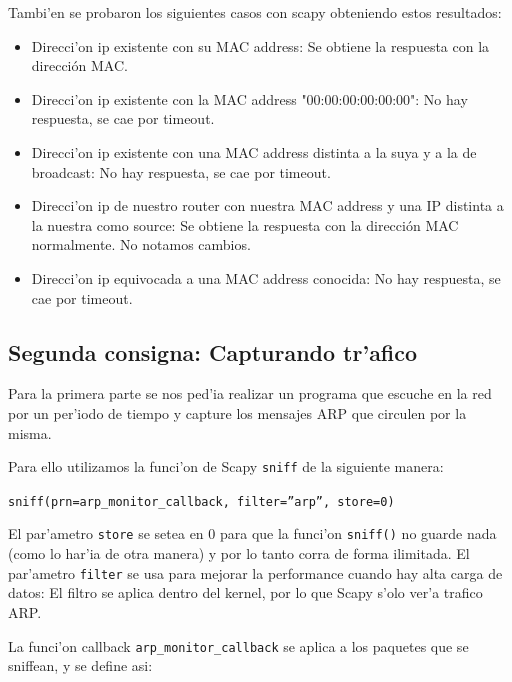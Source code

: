 \documentclass[a4paper,10pt]{article}
\begin{document}
Tambi'en se probaron los siguientes casos con scapy obteniendo estos resultados:

\begin{itemize}
	\item Direcci'on ip existente con su MAC address: Se obtiene la respuesta con la dirección MAC.
	\item Direcci'on ip existente con la MAC address "00:00:00:00:00:00": No hay respuesta, se cae por timeout.
	\item Direcci'on ip existente con una MAC address distinta a la suya y a la de broadcast: No hay respuesta, se cae por timeout.
	\item Direcci'on ip de nuestro router con nuestra MAC address y una IP distinta a la nuestra como source: Se obtiene la respuesta con la dirección MAC normalmente. No notamos cambios.
	\item Direcci'on ip equivocada a una MAC address conocida: No hay respuesta, se cae por timeout.
\end{itemize}

\subsection{Segunda consigna: Capturando tr'afico}
\label{expli1:}

Para la primera parte se nos ped'ia realizar un programa que escuche en la red por un per'iodo de tiempo y capture los mensajes ARP que circulen por la misma.

\vspace*{5 mm}

Para ello utilizamos la funci'on de Scapy \texttt{sniff} de la siguiente manera:

\vspace*{5 mm}

\texttt{sniff(prn=arp\_monitor\_callback, filter=''arp'', store=0)}

\vspace*{5 mm}

El par'ametro \texttt{store} se setea en 0 para que la funci'on \texttt{sniff()} no guarde nada (como lo har'ia de otra manera) y por lo tanto corra de forma ilimitada. El par'ametro \texttt{filter} se usa para mejorar la performance cuando hay alta carga de datos: El filtro se aplica dentro del kernel, por lo que Scapy s'olo ver'a trafico ARP.

\vspace*{5 mm}

La funci'on callback \texttt{arp\_monitor\_callback} se aplica a los paquetes que se sniffean, y se define asi:
\end{document}
